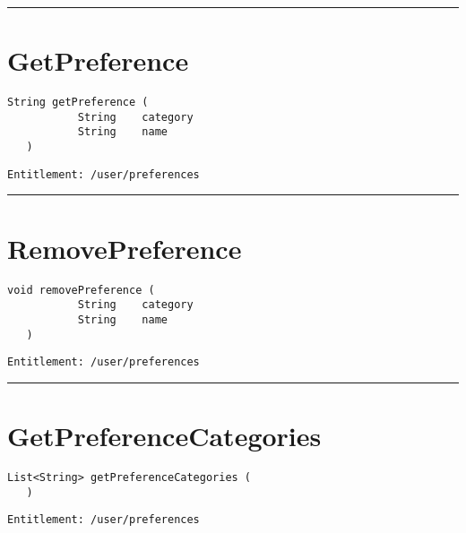 \rule{12cm}{2pt}
\section{GetPreference}
\label{Api:GetPreference}
\begin{lstlisting}[style=nonumbers]
   String getPreference (
           String    category
           String    name
   )
\end{lstlisting}
\begin{Verbatim}[formatcom=\color{Maroon}]
  Entitlement: /user/preferences
\end{Verbatim}



\rule{12cm}{2pt}
\section{RemovePreference}
\label{Api:RemovePreference}
\begin{lstlisting}[style=nonumbers]
   void removePreference (
           String    category
           String    name
   )
\end{lstlisting}
\begin{Verbatim}[formatcom=\color{Maroon}]
  Entitlement: /user/preferences
\end{Verbatim}



\rule{12cm}{2pt}
\section{GetPreferenceCategories}
\label{Api:GetPreferenceCategories}
\begin{lstlisting}[style=nonumbers]
   List<String> getPreferenceCategories (
   )
\end{lstlisting}
\begin{Verbatim}[formatcom=\color{Maroon}]
  Entitlement: /user/preferences
\end{Verbatim}



